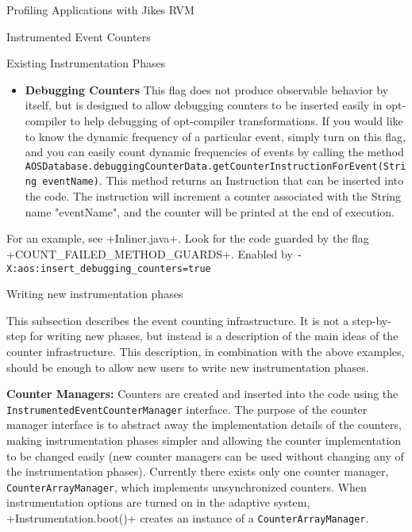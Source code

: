 \begin{section}{Profiling Applications with Jikes RVM}
\begin{subsection}{Instrumented Event Counters}
\begin{subsubsection}{Existing Instrumentation Phases}
\begin{itemize}
NOTE: Currently the counters are inserted at the end of HIR, so the counts \textit{will} capture the effect of HIR optimizations, and will not capture optimization that occurs in LIR or later.
  \item \textbf{Debugging Counters} This flag does not produce observable behavior by itself, but is designed to allow debugging counters to be inserted easily in opt-compiler to help debugging of opt-compiler transformations. If you would like to know the dynamic frequency of a particular event, simply turn on this flag, and you can easily count dynamic frequencies of events by calling the method \texttt{AOS\-Da\-ta\-base.de\-bug\-ging\-Coun\-ter\-Da\-ta.get\-Coun\-ter\-Instruction\-For\-Event(String eventName)}. This method returns an Instruction that can be inserted into the code. The instruction will increment a counter associated with the String name "eventName", and the counter will be printed at the end of execution.
\end{itemize}

For an example, see \spverb+Inliner.java+. Look for the code guarded by the flag \spverb+COUNT_FAILED_METHOD_GUARDS+. Enabled by \texttt{-X:aos:in\-sert\_de\-bugging\_coun\-ters=true}

\end{subsubsection}

\begin{subsubsection}{Writing new instrumentation phases}

This subsection describes the event counting infrastructure. It is not a step-by-step for writing new phases, but instead is a description of the main ideas of the counter infrastructure. This description, in combination with the above examples, should be enough to allow new users to write new instrumentation phases.

\textbf{Counter Managers:} Counters are created and inserted into the code using the \texttt{Instru\-men\-ted\-Event\-Coun\-ter\-Ma\-na\-ger} interface. The purpose of the counter manager interface is to abstract away the implementation details of the counters, making instrumentation phases simpler and allowing the counter implementation to be changed easily (new counter managers can be used without changing any of the instrumentation phases). Currently there exists only one counter manager, \texttt{Coun\-ter\-Array\-Ma\-na\-ger}, which implements unsynchronized counters. When instrumentation options are turned on in the adaptive system, \spverb+Instrumentation.boot()+ creates an instance of a \texttt{Coun\-ter\-Array\-Ma\-na\-ger}.


\end{subsubsection}
\end{subsection}
\end{section}
